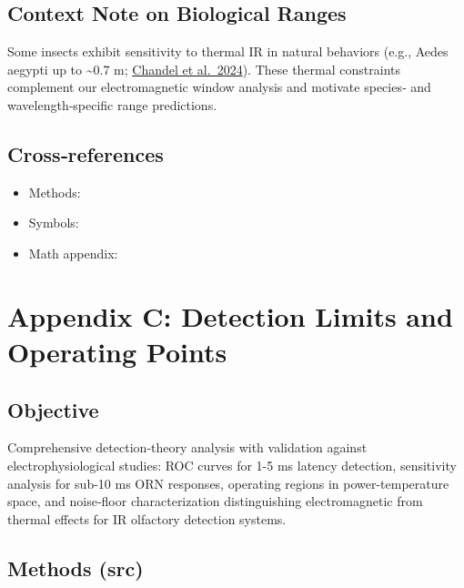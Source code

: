 \documentclass[
  13pt,
  a4paperpaper,
  12pt]{article}
\providecommand{\tightlist}{%
  \setlength{\itemsep}{0pt}\setlength{\parskip}{0pt}}
\let\oldsection\section
\renewcommand{\section}{\clearpage\oldsection}
\begin{document}
\subsection{Context Note on Biological
Ranges}\label{context-note-on-biological-ranges}

Some insects exhibit sensitivity to thermal IR in natural behaviors
(e.g., Aedes aegypti up to \textasciitilde0.7 m;
\href{https://www.nature.com/articles/s41586-024-07848-5}{Chandel et
al.~2024}). These thermal constraints complement our electromagnetic
window analysis and motivate species‑ and wavelength‑specific range
predictions.

\subsection{Cross‑references}\label{crossreferences-1}

\begin{itemize}
\tightlist
\item
  Methods: 
\item
  Symbols: 
\item
  Math appendix: 
\end{itemize}

\section{Appendix C: Detection Limits and Operating
Points}\label{sec:app_detection_limits}

\subsection{Objective}\label{objective-2}

Comprehensive detection‑theory analysis with validation against
electrophysiological studies: ROC curves for 1-5 ms latency detection,
sensitivity analysis for sub-10 ms ORN responses, operating regions in
power-temperature space, and noise‑floor characterization distinguishing
electromagnetic from thermal effects for IR olfactory detection systems.

\subsection{Methods (src)}\label{methods-src-2}
\end{document}
